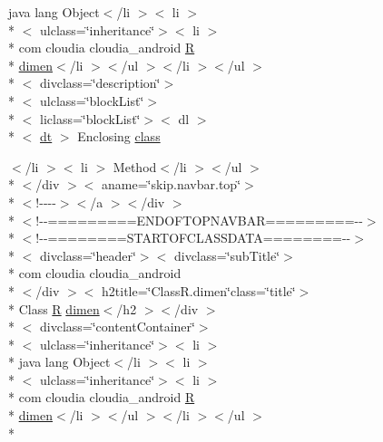 \begin{DoxyCompactItemize}
 java lang Object$<$/li $>$$<$ li $>$\\*
$<$ ulclass=\char`\"{}inheritance\char`\"{}$>$$<$ li $>$\\*
 com cloudia cloudia\-\_\-android \hyperlink{index-16_8html_a31e8fe59be5c20ce90a0090e28a0c1fe}{R} \\*
\hyperlink{index-4_8html_a788baa6fefe82077db8777df522abe04}{dimen}$<$/li $>$$<$/ul $>$$<$/li $>$$<$/ul $>$\\*
$<$ divclass=\char`\"{}description\char`\"{}$>$\\*
$<$ ulclass=\char`\"{}block\-List\char`\"{}$>$\\*
$<$ liclass=\char`\"{}block\-List\char`\"{}$>$$<$ dl $>$\\*
$<$ \hyperlink{stylesheet_8css_a107565fb4039d33b041380d6e0ea1d80}{dt} $>$ Enclosing \hyperlink{_r_8dimen_8html_a7a3a52462a6d81f017a93e59e3b1f43b}{class}
\item 
$<$/li $>$$<$ li $>$ Method$<$/li $>$$<$/ul $>$\\*
$<$/div $>$$<$ aname=\char`\"{}skip.\-navbar.\-top\char`\"{}$>$\\*
$<$!-\/-\/-\/-\/$>$$<$/a $>$$<$/div $>$\\*
$<$!-\/-\/=========E\-N\-D\-O\-F\-T\-O\-P\-N\-A\-V\-B\-A\-R=========-\/-\/$>$\\*
$<$!-\/-\/========S\-T\-A\-R\-T\-O\-F\-C\-L\-A\-S\-S\-D\-A\-T\-A========-\/-\/$>$\\*
$<$ divclass=\char`\"{}header\char`\"{}$>$$<$ divclass=\char`\"{}sub\-Title\char`\"{}$>$\\*
 com cloudia cloudia\-\_\-android\\*
$<$/div $>$$<$ h2title=\char`\"{}Class\-R.\-dimen\char`\"{}class=\char`\"{}title\char`\"{}$>$\\*
 Class \hyperlink{index-16_8html_a31e8fe59be5c20ce90a0090e28a0c1fe}{R} \hyperlink{index-4_8html_a788baa6fefe82077db8777df522abe04}{dimen}$<$/h2 $>$$<$/div $>$\\*
$<$ divclass=\char`\"{}content\-Container\char`\"{}$>$\\*
$<$ ulclass=\char`\"{}inheritance\char`\"{}$>$$<$ li $>$\\*
 java lang Object$<$/li $>$$<$ li $>$\\*
$<$ ulclass=\char`\"{}inheritance\char`\"{}$>$$<$ li $>$\\*
 com cloudia cloudia\-\_\-android \hyperlink{index-16_8html_a31e8fe59be5c20ce90a0090e28a0c1fe}{R} \\*
\hyperlink{index-4_8html_a788baa6fefe82077db8777df522abe04}{dimen}$<$/li $>$$<$/ul $>$$<$/li $>$$<$/ul $>$\\*

\end{DoxyCompactItemize}
